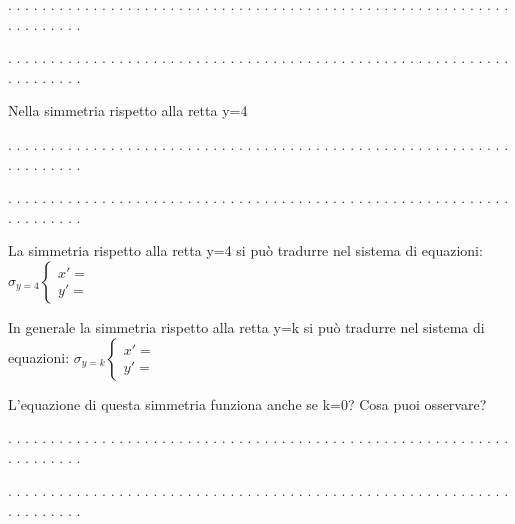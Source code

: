 . . . . . . . . . . . . . . . . . . . . . . . . . . . . . . . . . . . . . . . .
. . . . . . . . . . . . . . . . . . . . . . . . . . . .

. . . . . . . . . . . . . . . . . . . . . . . . . . . . . . . . . . . . . . . .
. . . . . . . . . . . . . . . . . . . . . . . . . . . .

Nella simmetria rispetto alla retta y=4

. . . . . . . . . . . . . . . . . . . . . . . . . . . . . . . . . . . . . . . .
. . . . . . . . . . . . . . . . . . . . . . . . . . . .

. . . . . . . . . . . . . . . . . . . . . . . . . . . . . . . . . . . . . . . .
. . . . . . . . . . . . . . . . . . . . . . . . . . . .

La simmetria rispetto alla retta y=4 si può tradurre nel sistema di equazioni:
\(\sigma_{y = 4} \left \{
\begin{array}{l}
x' = {} \\
y' = {}
\end{array} \right .\)

In generale la simmetria rispetto alla retta y=k si può tradurre nel sistema
di equazioni:
\(\sigma_{y = k} \left \{
\begin{array}{l}
x' = {} \\
y' = {}
\end{array} \right .\)

L'equazione di questa simmetria funziona anche se k=0? Cosa puoi osservare?

. . . . . . . . . . . . . . . . . . . . . . . . . . . . . . . . . . . . . . . .
. . . . . . . . . . . . . . . . . . . . . . . . . . . .

. . . . . . . . . . . . . . . . . . . . . . . . . . . . . . . . . . . . . . . .
. . . . . . . . . . . . . . . . . . . . . . . . . . . .

